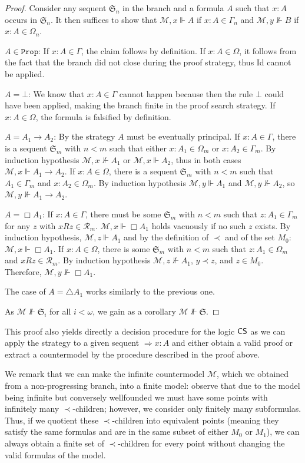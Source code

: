 \documentclass[runningheads,orivec]{llncs}
\newcommand{\CS}{\textnormal{\textsf{CS}}}
\newcommand{\Ra}{\Rightarrow}
\newcommand{\R}{\mathcal{R}}
\newcommand{\Mw}{\mathcal{M}}
\newcommand{\Seq}{\mathfrak{S}}
\newcommand{\Prop}{\mathtt{Prop}}
\begin{document}
\begin{proof}
    Consider any sequent $\Seq_n$ in the branch and a formula $A$ such that $x:A$  occurs in $\Seq_n$. It then suffices to show that $\Mw, x \Vdash A$ if $x:A \in \Gamma_n$ and $\Mw , y \nVdash B$ if $x:A \in \Omega_n$.

    $A \in \Prop$: If $x:A \in \Gamma $, the claim follows by definition. If $x:A \in \Omega$, it follows from the fact that the branch did not close during the proof strategy, thus Id cannot be applied.

    $A=\bot$: We know that $x:A \in \Gamma$ cannot happen because then the rule $\bot$ could have been applied, making the branch finite in the proof search strategy. If $x:A \in \Omega$, the formula is falsified by definition.

    \sloppy
    $A= A_1 \to A_2$: By the strategy $A$ must be eventually principal. 
    If ${x:A \in \Gamma}$, there is a sequent $\Seq_m$ with ${n < m}$ such that either ${x: A_1 \in \Omega_m}$ or ${x:A_2 \in \Gamma_m}$.
    By induction hypothesis $\Mw , x \nVdash A_1$ or $\Mw , x \Vdash A_2$, thus in both cases ${\Mw , x\Vdash A_1 \to A_2}$. 
    If $x:A \in \Omega$, there is a sequent $\Seq_m$ with $n < m$ such that $A_1 \in \Gamma_m$ and $x: A_2 \in \Omega_m$. By induction hypothesis $\Mw , y \Vdash A_1$ and $\Mw ,y \nVdash A_2$, so $\Mw ,y \nVdash A_1 \to A_2$.
    
    $A = \Box A_1$: If $x:A \in \Gamma$, there must be some $\Seq_m$ with $n < m$ such that $z : A_1 \in \Gamma_m$ for any $z$ with $xR z \in \R_m$. $\Mw, x \Vdash \Box A_1$ holds vacuously if no such $z$ exists. By induction hypothesis, $\Mw , z \Vdash A_1$ and by the definition of $\prec$ and of the set $M_0$: $\Mw , x \Vdash \Box A_1$.
    If $x:A \in \Omega$, there is some $\Seq_m$ with $n < m$ such that $z : A_1 \in \Omega_m$ and $xRz \in \R_m$. By induction hypothesis $\Mw , z \nVdash A_1$, $y \prec z$, and $z \in M_0$. Therefore, $\Mw , y \nVdash \Box A_1$.
    
    The case of $A = \triangle A_1$ works similarly to the previous one. 

    As $\Mw \nVdash \Seq_i$ for all $i < \omega$, we gain as a corollary $\Mw \nVdash \Seq$.  
\end{proof}

This proof also yields directly a decision procedure for the logic $\CS$ as we can apply the strategy to a given sequent $\Ra x:A$ and either obtain a valid proof or extract a countermodel by the procedure described in the proof above.

We remark that we can make the infinite countermodel $\Mw$, which we obtained from a non-progressing branch, into a finite model:
observe that due to the model being infinite but conversely wellfounded we must have some points with infinitely many $\prec$-children; however, we consider only finitely many subformulas. Thus, if we quotient these $\prec$-children into equivalent points (meaning they satisfy the same formulas and are in the same subset of either $M_0$ or $M_1$), we can always obtain a finite set of $\prec$-children for every point without changing the valid formulas of the model. 
\end{document}
